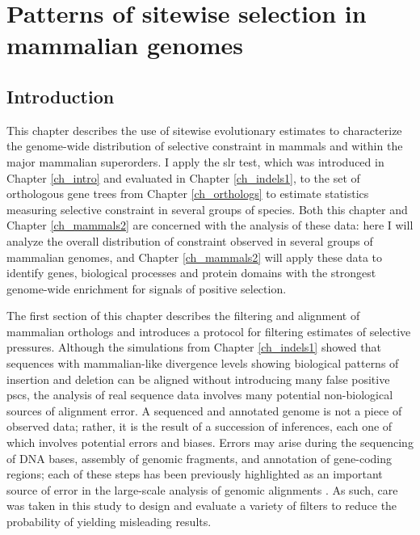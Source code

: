 \chapter{Patterns of sitewise selection in mammalian genomes}
\label{ch_mammals1}
\acresetall

\section{Introduction}

This chapter describes the use of sitewise evolutionary estimates to
characterize the genome-wide distribution of selective constraint in
mammals and within the major mammalian superorders. I apply the
\ac{slr} test, which was introduced in Chapter \ref{ch_intro} and
evaluated in Chapter \ref{ch_indels1}, to the set of orthologous gene
trees from Chapter \ref{ch_orthologs} to estimate statistics measuring
\sw selective constraint in several groups of \mammln species. Both
this chapter and Chapter \ref{ch_mammals2} are concerned with the
analysis of these \sw data: here I will analyze the overall
distribution of constraint observed in several groups of mammalian
genomes, and Chapter \ref{ch_mammals2} will apply these \sw data to
identify genes, biological processes and protein domains with the
strongest genome-wide enrichment for signals of positive selection.

The first section of this chapter describes the filtering and
alignment of mammalian orthologs and introduces a protocol for
filtering \sw estimates of selective pressures. Although the
simulations from Chapter \ref{ch_indels1} showed that sequences with
mammalian-like divergence levels showing biological patterns of
insertion and deletion can be aligned without introducing many false
positive \acp{psc}, the analysis of real sequence data involves many
potential non-biological sources of alignment error. A sequenced and
annotated genome is not a piece of observed data; rather, it is the
result of a succession of inferences, each one of which involves
potential errors and biases. Errors may arise during the sequencing of
DNA bases, assembly of genomic fragments, and annotation of
gene-coding regions; each of these steps has been previously
highlighted as an important source of error in the large-scale
analysis of genomic alignments
\citep{Schneider2009,Mallick2009,Milinkovitch2010,Hubisz2011}. As
such, care was taken in this study to design and evaluate a variety of
filters to reduce the probability of yielding misleading results.

